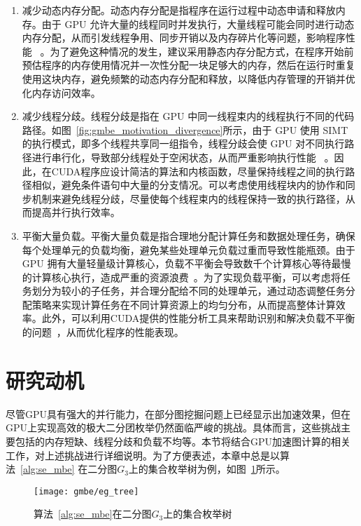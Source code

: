 \begin{enumerate}
  \item 减少动态内存分配。动态内存分配是指程序在运行过程中动态申请和释放内存。由于 GPU 允许大量的线程同时并发执行，大量线程可能会同时进行动态内存分配，从而引发线程争用、同步开销以及内存碎片化等问题，影响程序性能 ~\cite{DynamicMallocGpu21}。为了避免这种情况的发生，建议采用静态内存分配方式，在程序开始前预估程序的内存使用情况并一次性分配一块足够大的内存，然后在运行时重复使用这块内存，避免频繁的动态内存分配和释放，以降低内存管理的开销并优化内存访问效率。
  
  \item 减少线程分歧。线程分歧是指在 GPU 中同一线程束内的线程执行不同的代码路径。如图~\ref{fig:gmbe_motivation_divergence}所示，由于 GPU 使用 SIMT 的执行模式，即多个线程共享同一组指令，线程分歧会使 GPU 对不同执行路径进行串行化，导致部分线程处于空闲状态，从而严重影响执行性能 ~\cite{CUDAProgrammingGuide}。因此，在CUDA程序应设计简洁的算法和内核函数，尽量保持线程之间的执行路径相似，避免条件语句中大量的分支情况。可以考虑使用线程块内的协作和同步机制来避免线程分歧，尽量使每个线程束内的线程保持一致的执行路径，从而提高并行执行效率。
  

  \item 平衡大量负载。平衡大量负载是指合理地分配计算任务和数据处理任务，确保每个处理单元的负载均衡，避免某些处理单元负载过重而导致性能瓶颈。由于 GPU 拥有大量轻量级计算核心，负载不平衡会导致数千个计算核心等待最慢的计算核心执行，造成严重的资源浪费~\cite{CUDAProgrammingGuide}。为了实现负载平衡，可以考虑将任务划分为较小的子任务，并合理分配给不同的处理单元，通过动态调整任务分配策略来实现计算任务在不同计算资源上的均匀分布，从而提高整体计算效率。此外，可以利用CUDA提供的性能分析工具来帮助识别和解决负载不平衡的问题~\cite{Nsight,CUDANsightSystems,CUDANsightProfile}，从而优化程序的性能表现。
  
\end{enumerate}


\section{研究动机}

尽管GPU具有强大的并行能力，在部分图挖掘问题上已经显示出加速效果，但在GPU上实现高效的极大二分团枚举仍然面临严峻的挑战。具体而言，这些挑战主要包括的内存短缺、线程分歧和负载不均等。本节将结合GPU加速图计算的相关工作，对上述挑战进行详细说明。为了方便表述，本章中总是以算法~\ref{alg:se_mbe} 在二分图$G_3$上的集合枚举树为例，如图~\ref{fig:gmbe_tree}所示。

\begin{figure} [H]
	\centering
  \vspace{0.1in}
	\texttt{[image: gmbe/eg\_tree]}
  \vspace{0.1in}
	\caption{算法~\ref{alg:se_mbe}在二分图$G_3$上的集合枚举树}

	\label{fig:gmbe_tree}
\end{figure}

